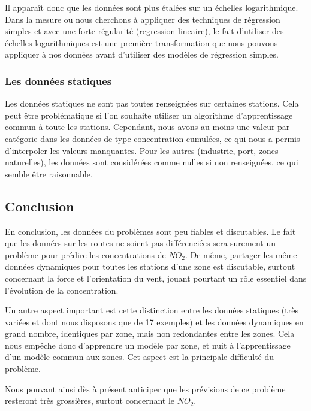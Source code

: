 Il apparaît donc que les données sont plus étalées sur un échelles logarithmique.
Dans la mesure ou nous cherchons à appliquer des techniques de régression simples %
et avec une forte régularité (regression lineaire), le fait d'utiliser des échelles logarithmiques est une première transformation que nous pouvons appliquer à nos données avant d'utiliser des modèles de régression simples.

\subsubsection{Les données statiques}

Les données statiques ne sont pas toutes renseignées sur certaines stations. Cela peut être problématique si l'on souhaite utiliser un algorithme d'apprentissage commun à toute les stations. Cependant, nous avons au moins une valeur par catégorie dans les données de type concentration cumulées, ce qui nous a permis d'interpoler les valeurs manquantes. Pour les autres (industrie, port, zones naturelles), les données sont considérées comme nulles si non renseignées, ce qui semble être raisonnable.


\subsection{Conclusion}

En conclusion, les données du problèmes sont peu fiables et discutables. Le fait que les données sur les routes ne soient pas différenciées sera surement un problème pour prédire les concentrations de $NO_2$. De même, partager les même données dynamiques pour toutes les stations d'une zone est discutable, surtout concernant la force et l'orientation du vent, jouant pourtant un rôle essentiel dans l'évolution de la concentration.

Un autre aspect important est cette distinction entre les données statiques (très variées et dont nous disposons que de 17 exemples) et les données dynamiques en grand nombre, identiques par zone, mais non redondantes entre les zones. Cela nous empêche donc d'apprendre un modèle par zone, et nuit à l'apprentissage d'un modèle commun aux zones. Cet aspect est la principale difficulté du problème.  

Nous pouvant ainsi dès à présent anticiper que les prévisions de ce problème resteront très grossières, surtout concernant le $NO_2$.

